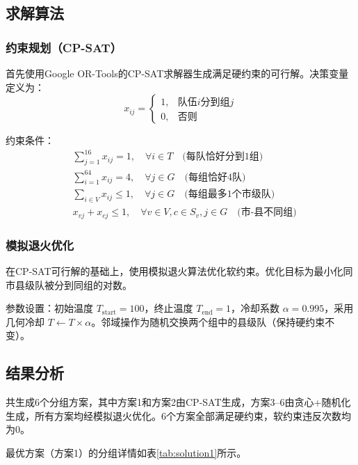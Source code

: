 \documentclass[a4paper,12pt]{article}
\begin{document}
\subsection{求解算法}

\subsubsection{约束规划（CP-SAT）}
首先使用Google OR-Tools的CP-SAT求解器生成满足硬约束的可行解。决策变量定义为：
\[
x_{ij} = \begin{cases} 1, & \text{队伍}i\text{分到组}j \\ 0, & \text{否则} \end{cases}
\]

约束条件：
\begin{align}
& \sum_{j=1}^{16} x_{ij} = 1, \quad \forall i \in T \quad \text{(每队恰好分到1组)} \\
& \sum_{i=1}^{64} x_{ij} = 4, \quad \forall j \in G \quad \text{(每组恰好4队)} \\
& \sum_{i \in V} x_{ij} \leq 1, \quad \forall j \in G \quad \text{(每组最多1个市级队)} \\
& x_{vj} + x_{cj} \leq 1, \quad \forall v \in V, c \in S_v, j \in G \quad \text{(市-县不同组)}
\end{align}

\subsubsection{模拟退火优化}
在CP-SAT可行解的基础上，使用模拟退火算法优化软约束。优化目标为最小化同市县级队被分到同组的对数。

参数设置：初始温度 $T_{\text{start}} = 100$，终止温度 $T_{\text{end}} = 1$，冷却系数 $\alpha = 0.995$，采用几何冷却 $T \leftarrow T \times \alpha$。邻域操作为随机交换两个组中的县级队（保持硬约束不变）。

\subsection{结果分析}
共生成6个分组方案，其中方案1和方案2由CP-SAT生成，方案3--6由贪心+随机化生成，所有方案均经模拟退火优化。6个方案全部满足硬约束，软约束违反次数均为0。

最优方案（方案1）的分组详情如表\ref{tab:solution1}所示。
\end{document}
